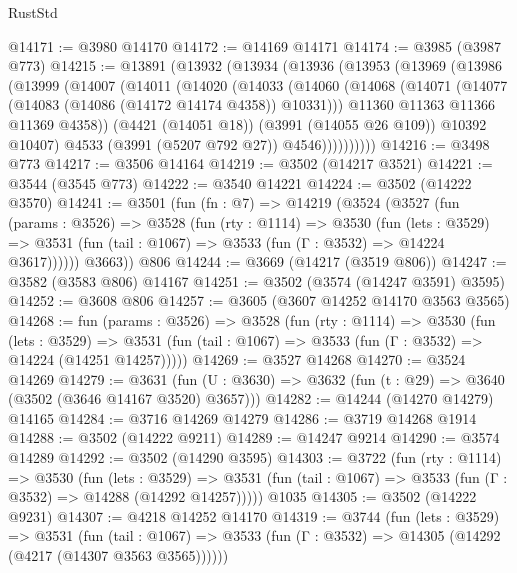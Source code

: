 \begin{lexlean}{RustStd}
\begin{coremodule}
@14171 := @3980 @14170
@14172 := @14169 @14171
@14174 := @3985 (@3987 @773)
@14215 := @13891
    (@13932
      (@13934
        (@13936
          (@13953
            (@13969
              (@13986
                (@13999
                  (@14007
                    (@14011
                      (@14020
                        (@14033
                          (@14060
                            (@14068
                              (@14071 (@14077 (@14083 (@14086 (@14172 @14174 @4358)) @10331)))
                              @11360
                              @11363
                              @11366
                              @11369
                              @4358))
                          (@4421 (@14051 @18))
                          (@3991 (@14055 @26 @109))
                          @10392
                          @10407)
                        @4533
                        (@3991 (@5207 @792 @27))
                        @4546))))))))))
@14216 := @3498 @773
@14217 := @3506 @14164
@14219 := @3502 (@14217 @3521)
@14221 := @3544 (@3545 @773)
@14222 := @3540 @14221
@14224 := @3502 (@14222 @3570)
@14241 := @3501
    (fun (fn : @7) =>
    @14219
      (@3524
        (@3527
          (fun (params : @3526) =>
          @3528
            (fun (rty : @1114) =>
            @3530
              (fun (lets : @3529) =>
              @3531 (fun (tail : @1067) => @3533 (fun (Γ : @3532) => @14224 @3617))))))
        @3663))
    @806
@14244 := @3669 (@14217 (@3519 @806))
@14247 := @3582 (@3583 @806) @14167
@14251 := @3502 (@3574 (@14247 @3591) @3595)
@14252 := @3608 @806
@14257 := @3605 (@3607 @14252 @14170 @3563 @3565)
@14268 := fun (params : @3526) =>
  @3528
    (fun (rty : @1114) =>
    @3530
      (fun (lets : @3529) =>
      @3531 (fun (tail : @1067) => @3533 (fun (Γ : @3532) => @14224 (@14251 @14257)))))
@14269 := @3527 @14268
@14270 := @3524 @14269
@14279 := @3631
    (fun (U : @3630) => @3632 (fun (t : @29) => @3640 (@3502 (@3646 @14167 @3520) @3657)))
@14282 := @14244 (@14270 @14279) @14165
@14284 := @3716 @14269 @14279
@14286 := @3719 @14268 @1914
@14288 := @3502 (@14222 @9211)
@14289 := @14247 @9214
@14290 := @3574 @14289
@14292 := @3502 (@14290 @3595)
@14303 := @3722
    (fun (rty : @1114) =>
    @3530
      (fun (lets : @3529) =>
      @3531 (fun (tail : @1067) => @3533 (fun (Γ : @3532) => @14288 (@14292 @14257)))))
    @1035
@14305 := @3502 (@14222 @9231)
@14307 := @4218 @14252 @14170
@14319 := @3744
    (fun (lets : @3529) =>
    @3531
      (fun (tail : @1067) =>
      @3533 (fun (Γ : @3532) => @14305 (@14292 (@4217 (@14307 @3563 @3565))))))

\end{coremodule}
\end{lexlean}

